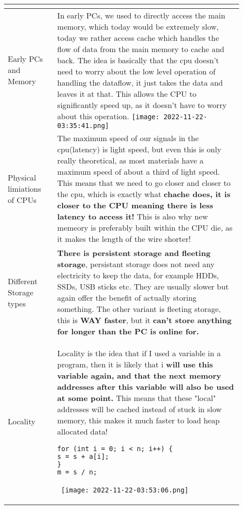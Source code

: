 \documentclass[main.tex,fontsize=8pt,paper=a4,paper=portrait,DIV=calc,]{scrartcl}
\begin{document}
\begin{table}[h!]
\begin{tabular}{|m{0.2\linewidth}|m{0.755\linewidth}|}
\begin{itemize}
\vspace{-3mm}
\end{itemize}\\ 
\hline
Early PCs and Memory & 
In early PCs, we used to directly access the main memory, which today would be extremely slow, today we rather access cache which handles the flow of data from the main memory to cache and back.\newline
\textcolor{OliveGreen}{The idea is basically that the cpu doesn't need to worry about the low level operation of handling the dataflow, it just takes the data and leaves it at that. This allows the CPU to significantly speed up, as it doesn't have to worry about this operation.}\newline
\texttt{[image: 2022-11-22-03:35:41.png]}\\
\hline
Physical limiations of CPUs & 
The maximum speed of our signals in the cpu(latency) is light speed, but even this is only really theoretical, as most materials have a maximum speed of about a third of light speed.\newline
This means that we need to go closer and closer to the cpu, which is exactly what \textbf{chache does, it is closer to the CPU meaning there is less latency to access it!}\newline
This is also why new memeory is preferably built within the CPU die, as it makes the length of the wire shorter!\\
\hline 
Different Storage types & 
\textbf{There is persistent storage and fleeting storage}, persistant storage does not need any electricity to keep the data, for example HDDs, SSDs, USB sticks etc.\newline
They are usually slower but again offer the benefit of actually storing something.\newline
The other variant is fleeting storage, this is \textbf{WAY faster}, but it \textbf{can't store anything for longer than the PC is online for.}\\
\hline
Locality & 
Locality is the idea that if I used a variable in a program, then it is likely that i \textbf{will use this variable again, and that the next memory addresses after this variable will also be used at some point.}\newline
This means that these "local" addresses will be cached instead of stuck in slow memory, this makes it much faster to load heap allocated data!\newline
\begin{lstlisting}
for (int i = 0; i < n; i++) {
s = s + a[i];
}
m = s / n; 
\end{lstlisting}
\, \newline
\texttt{[image: 2022-11-22-03:53:06.png]}\\
\hline
\end{tabular}
\end{table}
\end{document}
